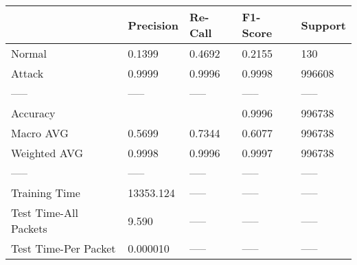 \begin{tabular}{lllll}
\toprule
{} &  Precision & Re-Call & F1-Score & Support \\
\midrule
Normal                &     0.1399 &  0.4692 &   0.2155 &     130 \\
Attack                &     0.9999 &  0.9996 &   0.9998 &  996608 \\
-----                 &      ----- &   ----- &    ----- &   ----- \\
Accuracy              &            &         &   0.9996 &  996738 \\
Macro AVG             &     0.5699 &  0.7344 &   0.6077 &  996738 \\
Weighted AVG          &     0.9998 &  0.9996 &   0.9997 &  996738 \\
-----                 &      ----- &   ----- &    ----- &   ----- \\
Training Time         &  13353.124 &   ----- &    ----- &   ----- \\
Test Time-All Packets &      9.590 &   ----- &    ----- &   ----- \\
Test Time-Per Packet  &   0.000010 &   ----- &    ----- &   ----- \\
\bottomrule
\end{tabular}
